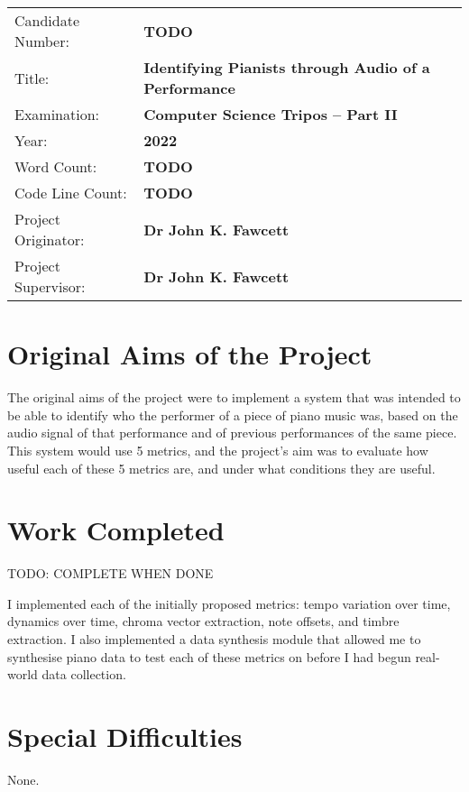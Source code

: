 \documentclass[crop=false]{standalone}
\begin{document}
  \begin{tabular}{ll}
    Candidate Number: &\textbf{TODO} \\
    Title: &\textbf{Identifying Pianists through Audio of a Performance} \\
    Examination: &\textbf{Computer Science Tripos -- Part II} \\
    Year: &\textbf{2022} \\
    Word Count: &\textbf{TODO}\footnotemark \\
    Code Line Count: &\textbf{TODO}\footnotemark \\
    Project Originator: &\textbf{Dr John K. Fawcett} \\
    Project Supervisor: &\textbf{Dr John K. Fawcett}
  \end{tabular}

  \section*{Original Aims of the Project}

  The original aims of the project were to implement a system that was intended to be able to identify who the performer of a piece of piano music was, based on the audio signal of that performance and of previous performances of the same piece. This system would use 5 metrics, and the project's aim was to evaluate how useful each of these 5 metrics are, and under what conditions they are useful.

  \section*{Work Completed}
  TODO: COMPLETE WHEN DONE

  I implemented each of the initially proposed metrics: tempo variation over time, dynamics over time, chroma vector extraction, note offsets, and timbre extraction. I also implemented a data synthesis module that allowed me to synthesise piano data to test each of these metrics on before I had begun real-world data collection. 

  \section*{Special Difficulties}
  None.

\end{document}
